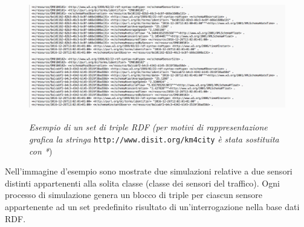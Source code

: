 \documentclass[12pt,a4paper,italian]{article}
\begin{document}
\begin{figure}[!h]
	\centering
	\includegraphics[height=5.5cm]{img/triplerdf2.png}
\caption{\emph{Esempio di un set di triple RDF (per motivi di rappresentazione grafica la stringa} \texttt{http://www.disit.org/km4city} \emph{è stata sostituita con *})}
\end{figure}

Nell'immagine d'esempio sono mostrate due simulazioni relative a due sensori distinti appartenenti alla solita classe (classe dei sensori del traffico). 
Ogni processo di simulazione genera un blocco di triple per ciascun sensore appartenente ad un set predefinito
risultato di un'interrogazione nella base dati RDF.
\end{document}
